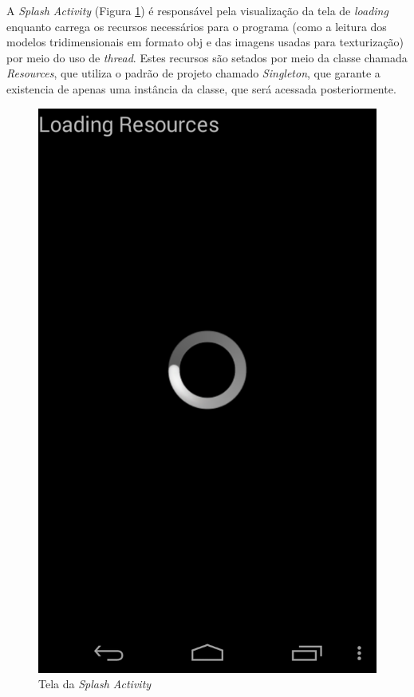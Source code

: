 	A \textit{Splash Activity} (Figura  \ref{splash_act}) é responsável pela visualização da tela de \textit{loading} enquanto carrega os recursos necessários para o programa (como a leitura dos modelos tridimensionais em formato obj e das imagens usadas para texturização) por meio do uso de \textit{thread}. Estes recursos são setados por meio da classe chamada \textit{Resources}, que utiliza o padrão de projeto chamado \textit{Singleton}, que garante a existencia de apenas uma instância da classe, que será acessada posteriormente.

	\begin{figure}[h]
	\centering
		\includegraphics[keepaspectratio=true,scale=0.2]{figuras/splash_act.png}
	\caption{Tela da \textit{Splash Activity}}
	\label{splash_act}
	\end{figure}

